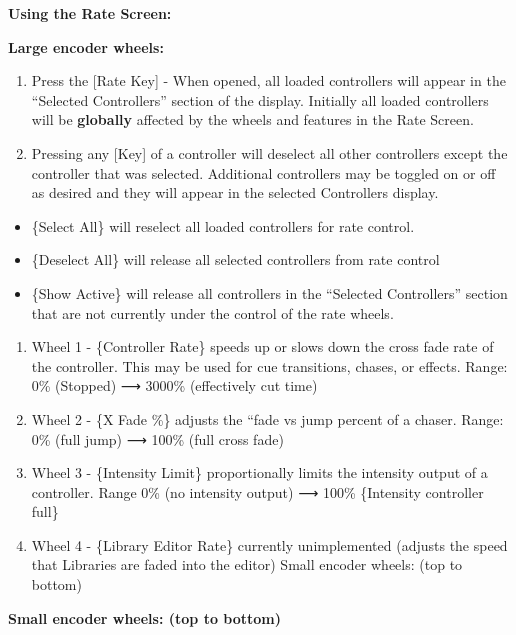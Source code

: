 \documentclass[
]{article}
\begin{document}
\textbf{Using the Rate Screen:}

\textbf{Large encoder wheels:}

\begin{enumerate}
\def\labelenumi{\arabic{enumi}.}
\item
  Press the {[}Rate Key{]} - When opened, all loaded controllers will appear in the ``Selected Controllers'' section of the display. Initially all loaded controllers will be \textbf{globally} affected by the wheels and features in the Rate Screen.
\item
  Pressing any {[}Key{]} of a controller will deselect all other controllers except the controller that was selected. Additional controllers may be toggled on or off as desired and they will appear in the selected Controllers display.
\end{enumerate}

\begin{itemize}
\item
  \{Select All\} will reselect all loaded controllers for rate control.
\item
  \{Deselect All\} will release all selected controllers from rate control
\item
  \{Show Active\} will release all controllers in the ``Selected Controllers'' section that are not currently under the control of the rate wheels.
\end{itemize}

\begin{enumerate}
\def\labelenumi{\arabic{enumi}.}
\setcounter{enumi}{2}
\item
  Wheel 1 - \{Controller Rate\} speeds up or slows down the cross fade rate of the controller. This may be used for cue transitions, chases, or effects. Range: 0\% (Stopped) ⟶ 3000\% (effectively cut time)
\item
  Wheel 2 - \{X Fade \%\} adjusts the ``fade vs jump percent of a chaser. Range: 0\% (full jump) ⟶ 100\% (full cross fade)
\item
  Wheel 3 - \{Intensity Limit\} proportionally limits the intensity output of a controller. Range 0\% (no intensity output) ⟶ 100\% \{Intensity controller full\}
\item
  { Wheel 4 - \{Library Editor Rate\} currently unimplemented (adjusts the speed that Libraries are faded into the editor) Small encoder wheels: (top to bottom) }
\end{enumerate}

\textbf{Small encoder wheels: (top to bottom)}
\end{document}
